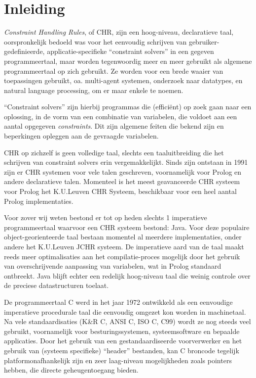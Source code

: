 \chapter{Inleiding}
\label{chap:inleiding}

{\em Constraint Handling Rules}, of CHR, zijn een hoog-niveau, declaratieve taal, oorspronkelijk bedoeld was voor het eenvoudig schrijven van gebruiker-gedefinieerde, applicatie-specifieke ``constraint solvers'' in een gegeven programmeertaal, maar worden tegenwoordig meer en meer gebruikt als algemene programmeertaal op zich gebruikt. Ze worden voor een brede waaier van toepassingen gebruikt, oa. multi-agent systemen, onderzoek naar datatypes, en natural language processing, om er maar enkele te noemen.

``Constraint solvers'' zijn hierbij programmas die (effici\"ent) op zoek gaan naar een oplossing, in de vorm van een combinatie van variabelen, die voldoet aan een aantal opgegeven {\em constraints}. Dit zijn algemene feiten die bekend zijn en beperkingen opleggen aan de gevraagde variabelen.

CHR op zichzelf is geen volledige taal, slechts een taaluitbreiding die het schrijven van constraint solvers erin vergemakkelijkt. Sinds zijn ontstaan in 1991 zijn er CHR systemen voor vele talen geschreven, voornamelijk voor Prolog en andere declaratieve talen. Momenteel is het meest geavanceerde CHR systeem voor Prolog het K.U.Leuven CHR Systeem, beschikbaar voor een heel aantal Prolog implementaties. 

Voor zover wij weten bestond er tot op heden slechts 1 imperatieve programmeertaal waarvoor een CHR systeem bestond: Java. Voor deze populaire object-georienteerde taal bestaan momentel al meerdere implementaties, onder andere het K.U.Leuven JCHR systeem. De imperatieve aard van de taal maakt reeds meer optimalisaties aan het compilatie-proces mogelijk door het gebruik van overschrijvende aanpassing van variabelen, wat in Prolog standaard ontbreekt. Java blijft echter een redelijk hoog-niveau taal die weinig controle over de preciese datastructuren toelaat.

De programmeertaal C werd in het jaar 1972 ontwikkeld als een eenvoudige imperatieve procedurale taal die eenvoudig omgezet kon worden in machinetaal. Na vele standaardisaties (K\&R C, ANSI C, ISO C, C99) wordt ze nog steeds veel gebruikt, voornamelijk voor besturingssystemen, systeemsoftware en bepaalde applicaties. Door het gebruik van een gestandaardiseerde voorverwerker en het gebruik van (systeem specifieke) ``header'' bestanden, kan C broncode tegelijk platformonafhankelijk zijn en zeer laag-niveau mogelijkheden zoals pointers hebben, die directe geheugentoegang bieden.

